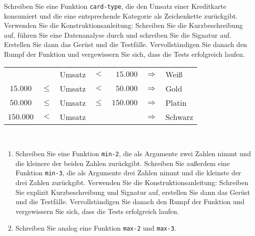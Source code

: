 \begin{aufgabe}
  Schreiben Sie eine Funktion \texttt{card-type}, die den Umsatz einer
  Kreditkarte konsumiert und die eine entsprechende Kategorie als
  Zeichenkette zurückgibt.  Verwenden Sie die Konstruktionsanleitung:
  Schreiben Sie die Kurzbeschreibung auf, führen Sie eine
  Datenanalyse durch und schreiben Sie die Signatur auf. Erstellen Sie
  dann das Gerüst und die Testfälle.  Vervollständigen Sie danach den
  Rumpf der Funktion und vergewissern Sie sich, dass die Tests
  erfolgreich laufen. \\

  \begin{tabular}{crlcrll}
    &        & Umsatz & $<$ & $15.000$   & $\Longrightarrow$ & Weiß \\
    $15.000$  & $\leq$ & Umsatz & $<$ & $50.000 $  & $\Longrightarrow$ & Gold \\
    $50.000$  & $\leq$ & Umsatz & $\leq$ & $150.000 $ 
    & $\Longrightarrow$ & Platin \\
    $150.000$ & $<$ & Umsatz &     &            &  $\Longrightarrow$ & Schwarz \\
  \end{tabular} \\
\end{aufgabe}

\begin{aufgabe}

  \begin{enumerate}

  \item Schreiben Sie eine Funktion \texttt{min-2}, die als Argumente zwei
    Zahlen nimmt und die kleinere der beiden Zahlen zurückgibt.  Schreiben
    Sie außerdem eine Funktion \texttt{min-3}, die als Argumente drei
    Zahlen nimmt und die kleinste der drei Zahlen zurückgibt.  Verwenden
    Sie die Konstruktionsanleitung: Schreiben Sie
    explizit Kurzbeschreibung und Signatur auf, erstellen Sie dann das
    Gerüst und die Testfälle.  Vervollständigen Sie danach den Rumpf der
    Funktion und vergewissern Sie sich, dass die Tests erfolgreich laufen.
    
  \item Schreiben Sie analog eine Funktion \texttt{max-2} und \texttt{max-3}.
    
  \end{enumerate}
\end{aufgabe}

